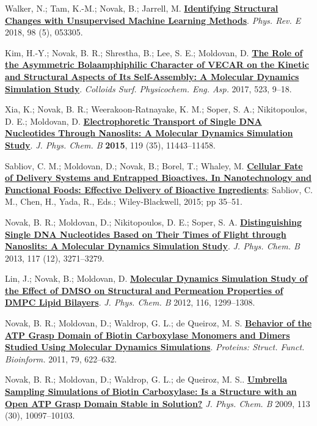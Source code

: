 \begin{cventries}
{\begin{cvitems}
       \item {Walker, N.; Tam, K.-M.; Novak, B.; Jarrell, M. \href{https://doi.org/10.1103/PhysRevE.98.053305}{\textbf{Identifying Structural Changes with Unsupervised Machine Learning Methods}}. \textit{Phys. Rev. E} 2018, 98 (5), 053305.}
        \item {Kim, H.-Y.; Novak, B. R.; Shrestha, B.; Lee, S. E.; Moldovan, D. \href{https://doi.org/10.1016/j.colsurfa.2017.03.060}{\textbf{The Role of the Asymmetric Bolaamphiphilic Character of VECAR on the Kinetic and Structural Aspects of Its Self-Assembly: A Molecular Dynamics Simulation Study}}. \textit{Colloids Surf. Physicochem. Eng. Asp.} 2017, 523, 9–18.}
        \item {Xia, K.; Novak, B. R.; Weerakoon-Ratnayake, K. M.; Soper, S. A.; Nikitopoulos, D. E.; Moldovan, D. \href{https://doi.org/10.1021/acs.jpcb.5b02798}{\textbf{Electrophoretic Transport of Single DNA Nucleotides Through Nanoslits: A Molecular Dynamics Simulation Study}}. \textit{J. Phys. Chem. B} \textbf{2015}, 119 (35), 11443–11458. }
        \item {Sabliov, C. M.; Moldovan, D.; Novak, B.; Borel, T.; Whaley, M. \href{https://onlinelibrary.wiley.com/doi/pdf/10.1002/9781118462157#page=47}{\textbf{Cellular Fate of Delivery Systems and Entrapped Bioactives. In Nanotechnology and Functional Foods: Effective Delivery of Bioactive Ingredients}}; Sabliov, C. M., Chen, H., Yada, R., Eds.; Wiley-Blackwell, 2015; pp 35–51.}
        \item {Novak, B. R.; Moldovan, D.; Nikitopoulos, D. E.; Soper, S. A. \href{https://doi.org/10.1021/jp309486c}{\textbf{Distinguishing Single DNA Nucleotides Based on Their Times of Flight through Nanoslits: A Molecular Dynamics Simulation Study}}. \textit{J. Phys. Chem. B} 2013, 117 (12), 3271–3279. }
        \item {Lin, J.; Novak, B.; Moldovan, D. \href{https://doi.org/10.1021/jp208145b}{\textbf{Molecular Dynamics Simulation Study of the Effect of DMSO on Structural and Permeation Properties of DMPC Lipid Bilayers}}. \textit{J. Phys. Chem. B} 2012, 116, 1299–1308. }
        \item {Novak, B. R.; Moldovan, D.; Waldrop, G. L.; de Queiroz, M. S. \href{https://doi.org/10.1002/prot.22910}{\textbf{Behavior of the ATP Grasp Domain of Biotin Carboxylase Monomers and Dimers Studied Using Molecular Dynamics Simulations}}. \textit{Proteins: Struct. Funct. Bioinform.} 2011, 79, 622–632.}
        \item{Novak, B. R.; Moldovan, D.; Waldrop, G. L.; de Queiroz, M. S.. \href{https://doi.org/10.1021/jp810650q}{\textbf{Umbrella Sampling Simulations of Biotin Carboxylase: Is a Structure with an Open ATP Grasp Domain Stable in Solution?}} \textit{J. Phys. Chem. B} 2009, 113 (30), 10097–10103.}

\end{cvitems}}
\end{cventries}

